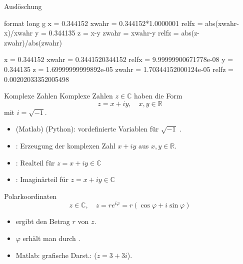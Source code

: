 \documentclass[hyperref={xetex}]{beamer}
\begin{document}
\begin{frame}[fragile]{Auslöschung}
\begin{matlabin}
format long g %
x = 0.344152
xwahr = 0.344152*1.0000001 %
relfx = abs(xwahr-x)/xwahr
y = 0.344135
z = x-y
zwahr = xwahr-y
relfz = abs(z-zwahr)/abs(zwahr) %
\end{matlabin}
\begin{matlab}
x = 0.344152
xwahr = 0.3441520344152
relfx = 9.99999900671778e-08
y = 0.344135
z = 1.69999999999892e-05
zwahr = 1.70344152000124e-05
relfz = 0.00202033352005498
\end{matlab}

\end{frame}



%
%
\begin{frame}[fragile]{Komplexe Zahlen}
Komplexe Zahlen $z \in \mathbb{C}$ haben die Form
\[ z = x +iy, \quad x,y \in \mathbb{R} \]
mit $i=\sqrt{-1}$. 
\begin{itemize}
  \item {}(Matlab) (Python): vordefinierte Variablen für $\sqrt{-1}$ .
\item {}: Erzeugung der komplexen Zahl $x + iy$ aus $x,y \in
  \mathbb{R}$.
\item {}: Realteil für $z=x+iy \in \mathbb{C}$ 
\item {}: Imaginärteil für $z=x+iy \in \mathbb{C}$
\end{itemize} 
\end{frame}
\begin{frame}[fragile]{Polarkoordinaten}
\alert{ \[ z \in \mathbb{C}, \quad z=re^{i \varphi}=r(\cos \varphi + i \sin
  \varphi) \]}
\begin{itemize}
\item {} ergibt den Betrag $r$ von $z$.
\item $\varphi$ erhält man durch .
\item Matlab: grafische Darst.:   ($z=3+3i$). \\
 \\ 
\end{itemize}
\end{frame}
\end{document}

